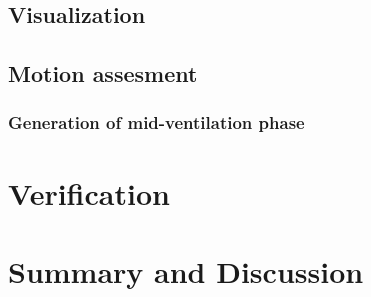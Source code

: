 \documentclass[type=dr, dr=rernat, accentcolor=tud7b,colorbacktitle, bigchapter, openright, twoside, 12pt ]{tudthesis}
\begin{document}
\subsection{Visualization}

\subsection{Motion assesment}

\subsubsection{Generation of mid-ventilation phase}


\section{Verification}

\section{Summary and Discussion}



{}
% 
\end{document}
